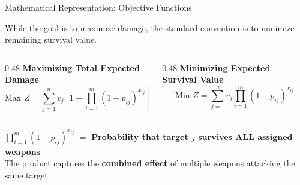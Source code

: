 \documentclass[aspectratio=169,10pt]{beamer}
\begin{document}
\begin{frame}{Mathematical Representation: Objective Functions}


  \vspace{0.15cm}
  {\footnotesize
  While the goal is to maximize damage, the standard convention is to minimize
  remaining survival value.
  }

  \vspace{0.35cm}

  \begin{columns}[T]

    \begin{column}{0.48\textwidth}
      {\footnotesize\color{navydark}\textbf{Maximizing Total Expected Damage}}
      \vspace{0.2cm}
      {\small
      \[
        \text{Max } Z = \sum_{j=1}^{n} v_j
        \left[ 1 - \prod_{i=1}^{m} (1-p_{ij})^{x_{ij}} \right]
      \]
      }
    \end{column}

    \begin{column}{0.48\textwidth}
      {\footnotesize\color{tealaccent}\textbf{Minimizing Expected Survival Value}}
      \vspace{0.2cm}
      {\small
      \[
        \text{Min } Z = \sum_{j=1}^{n} v_j \prod_{i=1}^{m} (1-p_{ij})^{x_{ij}}
      \]
      }
    \end{column}

  \end{columns}

  \vspace{0.35cm}


  \vspace{0.15cm}
  {\footnotesize
  $\prod_{i=1}^{m}(1-p_{ij})^{x_{ij}}$ $=$ \textbf{Probability that target $j$ survives ALL assigned weapons}\\[3pt]
  The product captures the \textbf{combined effect} of multiple weapons attacking the same target.
  }

\end{frame}
\end{document}
